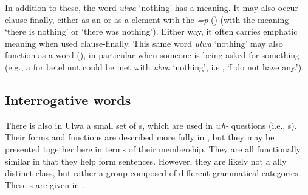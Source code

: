 In addition to these, the word \textit{ulwa} ‘nothing’ has a  meaning. It may also occur clause-finally, either as an  or as a  element with the  \textit{=p} () (with the meaning ‘there is nothing’ or ‘there was nothing’). Either way, it often carries emphatic meaning when used clause-finally. This same word \textit{ulwa} ‘nothing’ may also function as a  word (), in particular when someone is being asked for something (e.g., a  for betel nut could be met with \textit{ulwa} ‘nothing’, i.e., ‘I do not have any.’).


\subsection{Interrogative words}\label{sec:8.3.2}



There is also in Ulwa a small set of s, which are used in \textit{wh-} questions (i.e., s). Their forms and functions are described more fully in , but they may be presented together here in terms of their  membership. They are all functionally similar in that they help form  sentences. However, they are likely not a ally distinct class, but rather a group composed of different grammatical categories. These s are given in .

